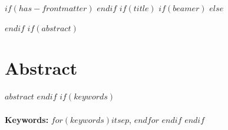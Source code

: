 $if(has-frontmatter)$
\frontmatter
$endif$
$if(title)$
$if(beamer)$
\frame{\titlepage}
$else$
\begin{singlespace}
    \maketitle
\end{singlespace}
$endif$
$if(abstract)$
\section*{Abstract}
$abstract$
$endif$
$if(keywords)$
\\\\\textbf{Keywords:} $for(keywords)$\lowercase{$it$}$sep$, $endfor$
$endif$
$endif$
\thispagestyle{plain}

